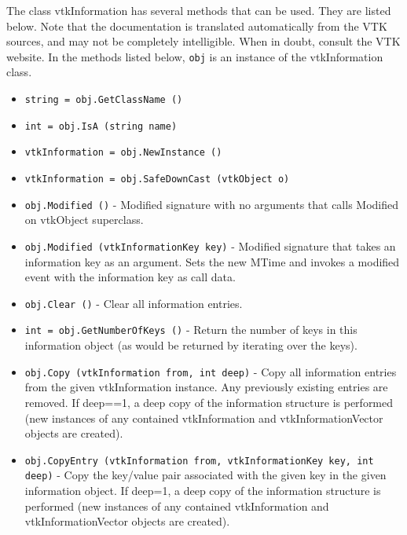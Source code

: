 The class vtkInformation has several methods that can be used.
  They are listed below.
Note that the documentation is translated automatically from the VTK sources,
and may not be completely intelligible.  When in doubt, consult the VTK website.
In the methods listed below, \verb|obj| is an instance of the vtkInformation class.
\begin{itemize}
\item  \verb|string = obj.GetClassName ()|

\item  \verb|int = obj.IsA (string name)|

\item  \verb|vtkInformation = obj.NewInstance ()|

\item  \verb|vtkInformation = obj.SafeDownCast (vtkObject o)|

\item  \verb|obj.Modified ()| -  Modified signature with no arguments that calls Modified
 on vtkObject superclass.

\item  \verb|obj.Modified (vtkInformationKey key)| -  Modified signature that takes an information key as an argument.
 Sets the new MTime and invokes a modified event with the
 information key as call data.

\item  \verb|obj.Clear ()| -  Clear all information entries.

\item  \verb|int = obj.GetNumberOfKeys ()| -  Return the number of keys in this information object (as would be returned
 by iterating over the keys).

\item  \verb|obj.Copy (vtkInformation from, int deep)| -  Copy all information entries from the given vtkInformation
 instance.  Any previously existing entries are removed.  If
 deep==1, a deep copy of the information structure is performed (new
 instances of any contained vtkInformation and vtkInformationVector
 objects are created).

\item  \verb|obj.CopyEntry (vtkInformation from, vtkInformationKey key, int deep)| -  Copy the key/value pair associated with the given key in the
 given information object.  If deep=1, a deep copy of the information
 structure is performed (new instances of any contained vtkInformation and
 vtkInformationVector objects are created).


\end{itemize}
